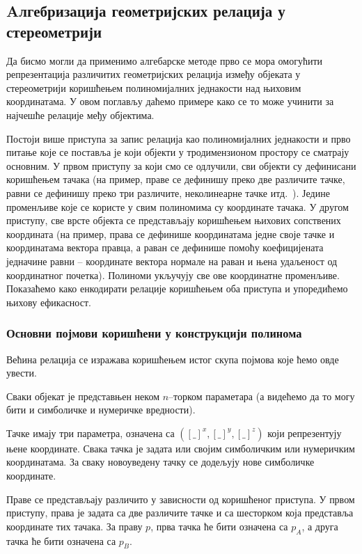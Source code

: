 \subsection{Aлгебризација геометријских релација у стереометрији}
\label{polynomials_6glava}

Да бисмо могли да применимо алгебарске методе прво се мора омогућити
репрезентација различитих геометријских релација између објеката у
стереометрији коришћењем полиномијалних једнакости над њиховим
координатама. У овом поглављу даћемо примере како се то може учинити
за најчешће релације међу објектима.

Постоји више приступа за запис релација као полиномијалних једнакости
и прво питање које се поставља је који објекти у тродимензионом
простору се сматрају основним. У првом приступу за који смо се
одлучили, сви објекти су дефинисани коришћењем тачака (на пример,
праве се дефинишу преко две различите тачке, равни се дефинишу преко
три различите, неколинеарне тачке итд.~). Једине променљиве које се
користе у свим полиномима су координате тачака. У другом приступу, све
врсте објекта се представљају коришћењем њихових сопствених координата
(на пример, права се дефинише координатама једне своје тачке и
координатама вектора правца, а раван се дефинише помоћу коефицијената
једначине равни -- координате вектора нормале на раван и њена
удаљеност од координатног почетка). Полиноми укључују све ове
координатне променљиве. Показаћемо како енкодирати релације коришћењем
оба приступа и упоредићемо њихову ефикасност.

\subsubsection{Основни појмови коришћени у конструкцији полинома}

Већина релација се изражава коришћењем истог скупа појмова које ћемо
овде увести.

Сваки објекат је представњен неком $n$--торком параметара (а видећемо
да то могу бити и симболичке и нумеричке вредности).

Тачке имају три параметра, означена са $({[\_]}^x, {[\_]}^y,
{[\_]}^z)$ који репрезентују њене координате. Свака тачка је задата
или својим симболичким или нумеричким координатама. За сваку
новоуведену тачку се додељују нове симболичке координате.

Праве се представљају различито у зависности од коришћеног приступа. У
првом приступу, права је задата са две различите тачке и са шесторком
која представља координате тих тачака. За праву $p$, прва тачка ће
бити означена са $p_A$, а друга тачка ће бити означена са $p_B$.

